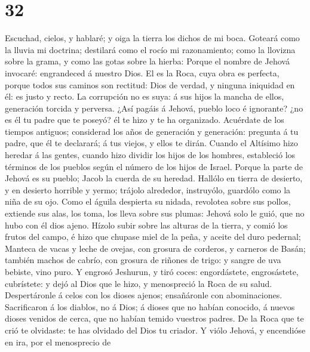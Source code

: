 \hypertarget{section-31}{%
\section{32}\label{section-31}}

 Escuchad, cielos, y hablaré; y oiga la tierra los dichos de
mi boca.  Goteará como la lluvia mi doctrina; destilará como
el rocío mi razonamiento; como la llovizna sobre la grama, y como las
gotas sobre la hierba:  Porque el nombre de Jehová invocaré:
engrandeced á nuestro Dios.  El es la Roca, cuya obra es
perfecta, porque todos sus caminos son rectitud: Dios de verdad, y
ninguna iniquidad en él: es justo y recto.  La corrupción no
es suya: á sus hijos la mancha de ellos, generación torcida y perversa.
 ¿Así pagáis á Jehová, pueblo loco é ignorante? ¿no es él tu
padre que te poseyó? él te hizo y te ha organizado. 
Acuérdate de los tiempos antiguos; considerad los años de generación y
generación: pregunta á tu padre, que él te declarará; á tus viejos, y
ellos te dirán.  Cuando el Altísimo hizo heredar á las
gentes, cuando hizo dividir los hijos de los hombres, estableció los
términos de los pueblos según el número de los hijos de Israel.
 Porque la parte de Jehová es su pueblo; Jacob la cuerda de
su heredad.  Hallólo en tierra de desierto, y en desierto
horrible y yermo; trájolo alrededor, instruyólo, guardólo como la niña
de su ojo.  Como el águila despierta su nidada, revolotea
sobre sus pollos, extiende sus alas, los toma, los lleva sobre sus
plumas:  Jehová solo le guió, que no hubo con él dios
ajeno.  Hízolo subir sobre las alturas de la tierra, y
comió los frutos del campo, é hizo que chupase miel de la peña, y aceite
del duro pedernal;  Manteca de vacas y leche de ovejas, con
grosura de corderos, y carneros de Basán; también machos de cabrío, con
grosura de riñones de trigo: y sangre de uva bebiste, vino puro.
 Y engrosó Jeshurun, y tiró coces: engordástete,
engrosástete, cubrístete: y dejó al Dios que le hizo, y menospreció la
Roca de su salud.  Despertáronle á celos con los dioses
ajenos; ensañáronle con abominaciones.  Sacrificaron á los
diablos, no á Dios; á dioses que no habían conocido, á nuevos dioses
venidos de cerca, que no habían temido vuestros padres.  De
la Roca que te crió te olvidaste: te has olvidado del Dios tu criador.
 Y viólo Jehová, y encendióse en ira, por el menosprecio de
